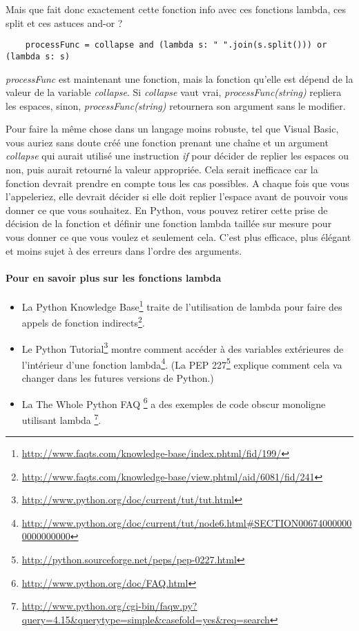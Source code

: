 Mais que fait donc exactement cette fonction info avec ces fonctions lambda, ces split et ces astuces and-or ?

\begin{lstlisting}
    processFunc = collapse and (lambda s: " ".join(s.split())) or (lambda s: s)
\end{lstlisting}


\emph{processFunc} est maintenant une fonction, mais la fonction qu’elle est dépend de la valeur de la variable \emph{collapse}. Si \emph{collapse} vaut vrai, \emph{processFunc(string)} repliera les espaces, sinon, \emph{processFunc(string)} retournera son argument sans le modifier.

Pour faire la même chose dans un langage moins robuste, tel que Visual Basic, vous auriez sans doute créé une fonction prenant une chaîne et un argument \emph{collapse} qui aurait utilisé une instruction \emph{if} pour décider de replier les espaces ou non, puis aurait retourné la valeur appropriée. Cela serait inefficace car la fonction devrait prendre en compte tous les cas possibles. A chaque fois que vous l’appeleriez, elle devrait décider si elle doit replier l’espace avant de pouvoir vous donner ce que vous souhaitez. En Python, vous pouvez retirer cette prise de décision de la fonction et définir une fonction lambda taillée sur mesure pour vous donner ce que vous voulez et seulement cela. C’est plus efficace, plus élégant et moins sujet à des erreurs dans l’ordre des arguments.

\paragraph{Pour en savoir plus sur les fonctions lambda}

\begin{itemize}
    \item La Python Knowledge Base\footnote{\url{http://www.faqts.com/knowledge-base/index.phtml/fid/199/}} traite de l’utilisation de lambda pour faire des appels de fonction indirects\footnote{\url{http://www.faqts.com/knowledge-base/view.phtml/aid/6081/fid/241}}.
    \item Le Python Tutorial\footnote{\url{http://www.python.org/doc/current/tut/tut.html}} montre comment accéder à des variables extérieures de l’intérieur d’une fonction lambda\footnote{\url{http://www.python.org/doc/current/tut/node6.html\#SECTION006740000000000000000}}. (La PEP 227\footnote{\url{http://python.sourceforge.net/peps/pep-0227.html}} explique comment cela va changer dans les futures versions de Python.)
    \item La The Whole Python FAQ \footnote{\url{http://www.python.org/doc/FAQ.html}} a des exemples de code obscur monoligne utilisant lambda \footnote{\url{http://www.python.org/cgi-bin/faqw.py?query=4.15&querytype=simple&casefold=yes&req=search}}.
\end{itemize}

